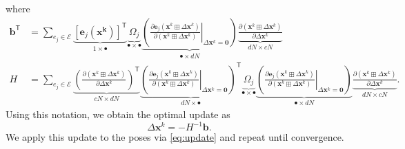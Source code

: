 \documentclass{article}
\newcommand{\transp}{{\scriptstyle{\mathsf{T}}}}
\begin{document}
\normalsize
%
where
%
\begin{align*}
    \mathbf{b}^\transp &= \sum_{e_j \in \mathcal{E}} \underbrace{[ \mathbf{e}_j(\mathbf{x^k}) ]^\transp }_{1 \times \bullet} \underbrace{\Omega_j}_{\bullet \times \bullet} \underbrace{\left( \left. \frac{\partial \mathbf{e}_j(\mathbf{x}^k \boxplus \Delta \mathbf{x}^k)}{\partial (\mathbf{x}^k \boxplus \Delta \mathbf{x}^k)} \right|_{\Delta \mathbf{x}^k = \mathbf{0}} \right)}_{\bullet \times dN} \underbrace{\frac{\partial (\mathbf{x}^k \boxplus \Delta \mathbf{x}^k)}{\partial \Delta \mathbf{x}^k}}_{dN \times cN} \\
    H &= \sum_{e_j \in \mathcal{E}} \underbrace{ \left( \frac{\partial (\mathbf{x}^k \boxplus \Delta \mathbf{x}^k)}{\partial \Delta \mathbf{x}^k} \right)^\transp}_{cN \times dN} \underbrace{\left( \left. \frac{\partial \mathbf{e}_j(\mathbf{x}^k \boxplus \Delta \mathbf{x}^k)}{\partial (\mathbf{x}^k \boxplus \Delta \mathbf{x}^k)} \right|_{\Delta \mathbf{x}^k = \mathbf{0}} \right)^\transp}_{dN \times \bullet} \underbrace{\Omega_j}_{\bullet \times \bullet} \underbrace{\left( \left. \frac{\partial \mathbf{e}_j(\mathbf{x}^k \boxplus \Delta \mathbf{x}^k)}{\partial (\mathbf{x}^k \boxplus \Delta \mathbf{x}^k)} \right|_{\Delta \mathbf{x}^k = \mathbf{0}} \right)}_{\bullet \times dN} \underbrace{\frac{\partial (\mathbf{x}^k \boxplus \Delta \mathbf{x}^k)}{\partial \Delta \mathbf{x}^k}}_{dN \times cN}.
\end{align*}
%
Using this notation, we obtain the optimal update as
%
\begin{equation}
    \Delta \mathbf{x}^k = -H^{-1} \mathbf{b}.  \label{eq:deltax}
\end{equation}
%
We apply this update to the poses via \eqref{eq:update} and repeat until convergence.
\end{document}
